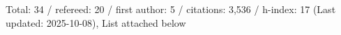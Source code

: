 Total: 34 / refereed: 20 / first author: 5 / citations: 3,536 / h-index: 17 (Last updated: 2025-10-08), List attached below